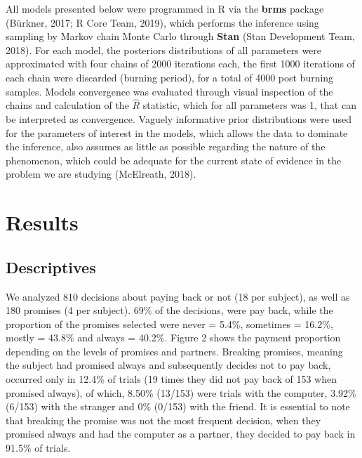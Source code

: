 \documentclass[12pt,]{article}
\begin{document}
All models presented below were programmed in R via the \textbf{brms}
package (Bürkner, 2017; R Core Team, 2019), which performs the inference
using sampling by Markov chain Monte Carlo through \textbf{Stan} (Stan
Development Team, 2018). For each model, the posteriors distributions of
all parameters were approximated with four chains of 2000 iterations
each, the first 1000 iterations of each chain were discarded (burning
period), for a total of 4000 post burning samples. Models convergence
was evaluated through visual inspection of the chains and calculation of
the \(\hat{R}\) statistic, which for all parameters was 1, that can be
interpreted as convergence. Vaguely informative prior distributions were
used for the parameters of interest in the models, which allows the data
to dominate the inference, also assumes as little as possible regarding
the nature of the phenomenon, which could be adequate for the current
state of evidence in the problem we are studying (McElreath, 2018).

\hypertarget{results}{%
\section{Results}\label{results}}

\hypertarget{descriptives}{%
\subsection{Descriptives}\label{descriptives}}

We analyzed 810 decisions about paying back or not (18 per subject), as
well as 180 promises (4 per subject). 69\% of the decisions, were pay
back, while the proportion of the promises selected were never = 5.4\%,
sometimes = 16.2\%, mostly = 43.8\% and always = 40.2\%. Figure 2 shows
the payment proportion depending on the levels of promises and partners.
Breaking promises, meaning the subject had promised always and
subsequently decides not to pay back, occurred only in 12.4\% of trials
(19 times they did not pay back of 153 when promised always), of which,
8.50\% (13/153) were trials with the computer, 3.92\% (6/153) with the
stranger and 0\% (0/153) with the friend. It is essential to note that
breaking the promise was not the most frequent decision, when they
promised always and had the computer as a partner, they decided to pay
back in 91.5\% of trials.
\end{document}
